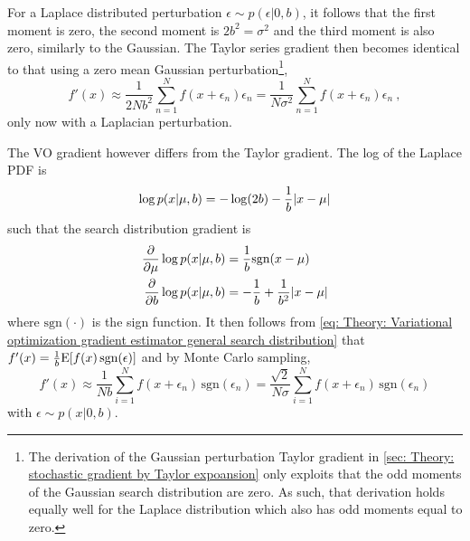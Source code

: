 For a Laplace distributed perturbation $\epsilon\sim p(\epsilon|0,b)$, it follows that the first moment is zero, the second moment is $2b^2=\sigma^2$ and the third moment is also zero, similarly to the Gaussian.
The Taylor series gradient then becomes identical to that using a zero mean Gaussian perturbation\footnote{The derivation of the Gaussian perturbation Taylor gradient in \autoref{sec: Theory: stochastic gradient by Taylor expoansion} only exploits that the odd moments of the Gaussian search distribution are zero. As such, that derivation holds equally well for the Laplace distribution which also has odd moments equal to zero.},
\begin{equation}
    f'(x) \approx \frac{1}{2Nb^2}\sum_{n=1}^N f(x+\epsilon_n)\epsilon_n = \frac{1}{N\sigma^2}\sum_{n=1}^N f(x+\epsilon_n)\epsilon_n \ ,\label{eq: Theory: Variational optimization Taylor VS VO for Laplace (Taylor)}
\end{equation}
only now with a Laplacian perturbation.

The \gls{VO} gradient however differs from the Taylor gradient. The log of the Laplace \gls{PDF} is
\begin{equation}
    \log p(x|\mu,b) = -\log(2b) - \frac{1}{b}{\left\lvert x-\mu\right\rvert}
\end{equation}
such that the search distribution gradient is
\begin{equation}
    \begin{aligned}
        \frac{\partial}{\partial\mu} \log p(x|\mu,b) &= \frac{1}{b}\text{sgn}(x-\mu)\\
        \frac{\partial}{\partial b} \log p(x|\mu,b) &= -\frac{1}{b}+\frac{1}{b^2}{\left\lvert x-\mu\right\rvert}\\
    \end{aligned}
\end{equation}
where $\text{sgn}(\cdot)$ is the sign function. It then follows from \eqref{eq: Theory: Variational optimization gradient estimator general search distribution} that $f'(x) = \frac{1}{b}\text{E}{\left[f(x)\,\text{sgn}(\epsilon)\right]}$ and by Monte Carlo sampling,
\begin{equation}
    f'(x) \approx \frac{1}{Nb}\sum_{i=1}^N f(x+\epsilon_n)\,\text{sgn}(\epsilon_n) = \frac{\sqrt{2}}{N\sigma}\sum_{i=1}^N f(x+\epsilon_n)\,\text{sgn}(\epsilon_n)\label{eq: Theory: Variational optimization Taylor VS VO for Laplace (VO)}
\end{equation}
with $\epsilon\sim p(x|0,b)$.

